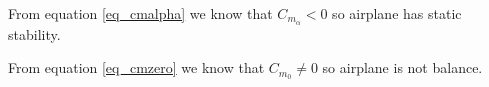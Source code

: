 



From equation \ref{eq_cmalpha} we know that $C_{m_{\alpha}} < 0$ so airplane has static stability.






From equation \ref{eq_cmzero} we know that $C_{m_{0}} \neq 0$ so airplane is not balance.
